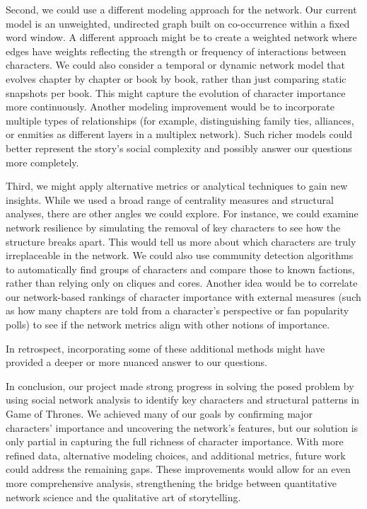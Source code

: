 \documentclass[12pt, a4paper]{article}
\begin{document}
Second, we could use a different modeling approach for the network. Our current model is an unweighted, 
undirected graph built on co-occurrence within a fixed word window. 
A different approach might be to create a weighted network where edges have weights reflecting the strength or 
frequency of interactions between characters.
We could also consider a temporal or dynamic network model that evolves chapter by chapter or book by book, 
rather than just comparing static snapshots per book. This might capture the evolution of character importance more continuously.
Another modeling improvement would be to incorporate multiple types of relationships 
(for example, distinguishing family ties, alliances, or enmities as different layers in a multiplex network). 
Such richer models could better represent the story’s social complexity and possibly answer our questions more completely. 

Third, we might apply alternative metrics or analytical techniques to gain new insights. 
While we used a broad range of centrality measures and structural analyses, 
there are other angles we could explore. 
For instance, we could examine network resilience by simulating the removal of key characters to see how the structure breaks apart.
This would tell us more about which characters are truly irreplaceable in the network. 
We could also use community detection algorithms to automatically find groups of characters and compare those to known factions, 
rather than relying only on cliques and cores. 
Another idea would be to correlate our network-based rankings of character importance with external measures 
(such as how many chapters are told from a character’s perspective or fan popularity polls) 
to see if the network metrics align with other notions of importance. 

In retrospect, incorporating some of these additional methods might have provided a deeper or more nuanced answer to our questions.

In conclusion, our project made strong progress in solving the posed problem by using social network analysis to identify key characters and structural patterns in Game of Thrones. We achieved many of our goals by confirming major characters’ importance and uncovering the network’s features, but our solution is only partial in capturing the full richness of character importance. With more refined data, alternative modeling choices, and additional metrics, future work could address the remaining gaps. These improvements would allow for an even more comprehensive analysis, strengthening the bridge between quantitative network science and the qualitative art of storytelling.
\end{document}
